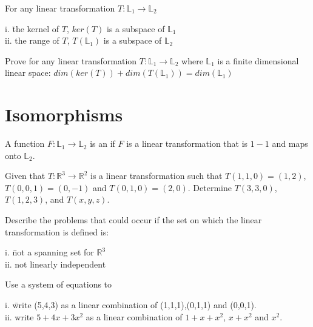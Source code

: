 \begin{theorem}
	For any linear transformation $T:\mathbb{L}_1 \longrightarrow \mathbb{L}_2 $
	\begin{tabbing} 
		\indent i. \quad  \=the kernel of $T$, $ker(T)$ is a subspace of $\mathbb{L}_1$ \\ 
		\indent ii.\>  the range of $T$, $T(\mathbb{L}_1)$ is a subspace of $\mathbb{L}_2$
	\end{tabbing}
\end{theorem} 

\vspace{.5cm}

\noindent {} Prove for any linear transformation $T:\mathbb{L}_1 \longrightarrow \mathbb{L}_2 $ where $\mathbb{L}_1$ is a finite dimensional linear space: $dim(ker(T))+dim(T(\mathbb{L}_1)) = dim(\mathbb{L}_1) $

\section{Isomorphisms}    \label{Isomorphisms}

\begin{defn}
	A function $ F:\mathbb{L}_1\longrightarrow \mathbb{L}_2$ is an  if $F$ is a linear transformation that is $1-1$ and maps onto $\mathbb{L}_2$. 
\end{defn}


\begin{myexa}[\bd{a}]
	 	Given that $T: \mathbb{R}^3 \longrightarrow \mathbb{R}^2$ is a linear transformation such that $T(1,1,0) = (1,2)$, $T(0,0,1)=(0,-1)$ and $T(0,1,0) =(2,0)$. Determine $T(3,3,0)$, $T(1,2,3)$, and $T(x,y,z)$.
\end{myexa}


 \noindent {} Describe the problems that could occur if the set on which the linear transformation is defined is:
 \begin{tabbing}
 	\indent i. \quad \= not a spanning set for $\mathbb{R}^3$ \\
 	\indent ii. \> not linearly independent 
 \end{tabbing}


 \begin{myexb}[\bd{b}]  Use a system of equations to 
 \begin{tabbing}
 	\indent i. \quad \= write (5,4,3) as a linear combination of (1,1,1),(0,1,1) and (0,0,1).  \\
 	\indent ii. \> write $5+4x +3x^2$ as a linear combination of $1+x+x^2$, $x+x^2$ and $x^2$.
 \end{tabbing}
 \end{myexb}
 

